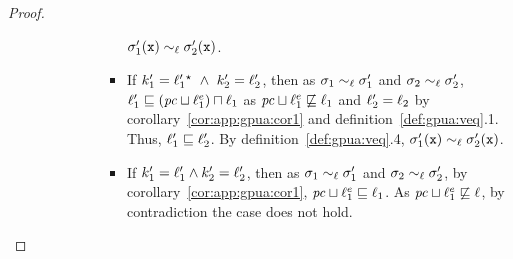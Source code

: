 \begin{proof}
\begin{enumerate}
\begin{itemize}
\begin{enumerate}
\begin{itemize}
\begin{itemize}
  $\sigma_1'(\texttt{x}) \sim_\ell \sigma_2'(\texttt{x})$.
\item  If $k_1' =  \ell_1'{}^\star   ~\wedge~k_2' = \ell_2'$, then as $\sigma_1
  \sim_\ell \sigma_1'$ and $\sigma_2 \sim_\ell \sigma_2'$, $\ell_1' \sqsubseteq
  (\mathit{pc} \sqcup \ell^e_1)\sqcap \ell_1$ as $\mathit{pc} \sqcup \ell^e_1\not\sqsubseteq \ell_1$ and $\ell_2' =
  \ell_2$ by corollary~\ref{cor:app:gpua:cor1} and definition~\ref{def:gpua:veq}.1. Thus,
  $\ell_1'\sqsubseteq \ell_2'$.  By definition~\ref{def:gpua:veq}.4, $\sigma_1'(\texttt{x})
  \sim_\ell \sigma_2'(\texttt{x})$.
\item If $k_1' = \ell_1' \wedge k_2' = \ell_2'$, then as $\sigma_1
  \sim_\ell \sigma_1'$ and $\sigma_2 \sim_\ell \sigma_2'$, by 
  corollary~\ref{cor:app:gpua:cor1}, $\mathit{pc} \sqcup \ell^e_1\sqsubseteq \ell_1$. As $\mathit{pc} \sqcup
  \ell^e_1 \not\sqsubseteq \ell$, by 
  contradiction the case does not hold.
 \end{itemize}
\end{itemize}



\end{enumerate}
\end{itemize}
\end{enumerate}
\end{proof}
